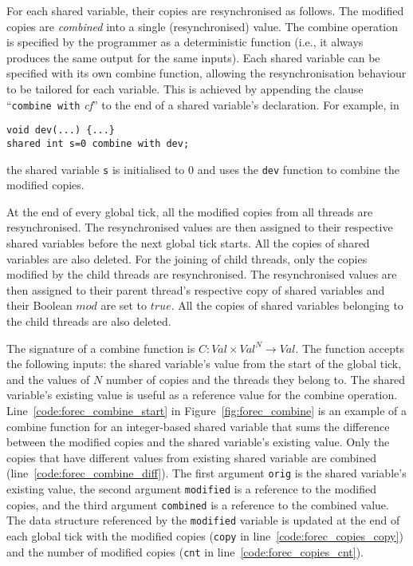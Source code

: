 For each shared variable, their copies are resynchronised as follows. The modified copies are 
\emph{combined} into a single (resynchronised) value. The combine operation is 
specified by the programmer as a deterministic function (i.e., it always produces the same output 
for the same inputs). Each shared variable can be specified with its own combine function, 
allowing the resynchronisation behaviour to be tailored for each variable. This is achieved by
appending the clause ``\verb$combine with$ \emph{cf}'' to the end of a shared variable's declaration. 
For example, in
\begin{lstlisting}[style=snippet]
void dev(...) {...}
shared int s=0 combine with dev;
\end{lstlisting}
the shared variable \verb$s$ is initialised to $0$ and uses the \verb$dev$ function to combine 
the modified copies.

At the end of every global tick, all the modified copies from all threads are 
resynchronised. The resynchronised values are then assigned to their respective shared 
variables before the next global tick starts. All the copies of shared variables are also deleted. 
For the joining of child threads, only the copies modified by the child threads are 
resynchronised. The resynchronised values are then assigned to their parent thread's respective 
copy of shared variables and their Boolean $\mathit{mod}$ are set to $\mathit{true}$. All the copies of 
shared variables belonging to the child threads are also deleted.

The signature of a combine function is $\mathit{C}: \mathit{Val} \times \mathit{Val}^N \to \mathit{Val}$. 
The function accepts the following inputs: the shared variable's value from the start of the global tick, and the values of 
$N$ number of copies and the threads they belong to. The shared variable's 
existing value is useful as a reference value for the combine operation.  
Line~\ref{code:forec_combine_start} in Figure~\ref{fig:forec_combine} 
is an example of a combine function for an integer-based shared variable that sums the difference between
the modified copies and the shared variable's existing value. Only the copies that have different 
values from existing shared variable are combined (line~\ref{code:forec_combine_diff}). The first argument \verb$orig$ 
is the shared variable's existing value, the second argument \verb$modified$ is a reference to the 
modified copies, and the third argument \verb$combined$ is a reference to the combined value. The 
data structure referenced by the \verb$modified$ variable is updated at the end of each global tick 
with the modified copies (\verb$copy$ in line~\ref{code:forec_copies_copy}) and the number
of modified copies (\verb$cnt$ in line~\ref{code:forec_copies_cnt}).

